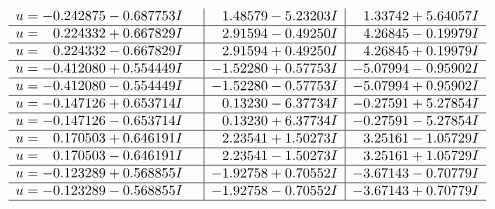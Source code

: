 \documentclass[1p]{elsarticle_modified}
\theoremstyle{definition}
\begin{document}
$$\begin{array}{c|c|c}
\begin{aligned}
u &= -0.242875 - 0.687753 I\end{aligned}
 & \phantom{-}1.48579 - 5.23203 I & \phantom{-}1.33742 + 5.64057 I \\ \hline\begin{aligned}
u &= \phantom{-}0.224332 + 0.667829 I\end{aligned}
 & \phantom{-}2.91594 - 0.49250 I & \phantom{-}4.26845 - 0.19979 I \\ \hline\begin{aligned}
u &= \phantom{-}0.224332 - 0.667829 I\end{aligned}
 & \phantom{-}2.91594 + 0.49250 I & \phantom{-}4.26845 + 0.19979 I \\ \hline\begin{aligned}
u &= -0.412080 + 0.554449 I\end{aligned}
 & -1.52280 + 0.57753 I & -5.07994 - 0.95902 I \\ \hline\begin{aligned}
u &= -0.412080 - 0.554449 I\end{aligned}
 & -1.52280 - 0.57753 I & -5.07994 + 0.95902 I \\ \hline\begin{aligned}
u &= -0.147126 + 0.653714 I\end{aligned}
 & \phantom{-}0.13230 - 6.37734 I & -0.27591 + 5.27854 I \\ \hline\begin{aligned}
u &= -0.147126 - 0.653714 I\end{aligned}
 & \phantom{-}0.13230 + 6.37734 I & -0.27591 - 5.27854 I \\ \hline\begin{aligned}
u &= \phantom{-}0.170503 + 0.646191 I\end{aligned}
 & \phantom{-}2.23541 + 1.50273 I & \phantom{-}3.25161 - 1.05729 I \\ \hline\begin{aligned}
u &= \phantom{-}0.170503 - 0.646191 I\end{aligned}
 & \phantom{-}2.23541 - 1.50273 I & \phantom{-}3.25161 + 1.05729 I \\ \hline\begin{aligned}
u &= -0.123289 + 0.568855 I\end{aligned}
 & -1.92758 + 0.70552 I & -3.67143 - 0.70779 I \\ \hline\begin{aligned}
u &= -0.123289 - 0.568855 I\end{aligned}
 & -1.92758 - 0.70552 I & -3.67143 + 0.70779 I\\
 \hline 
 \end{array}$$\newpage
\end{document}
